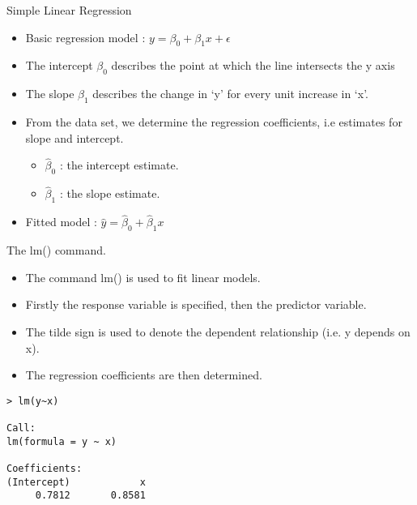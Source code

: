 \documentclass[pdf,default,slideColor,colorBG]{prosper}
\begin{document}
\begin{slide}{Simple Linear Regression}



\begin{itemize}
\item Basic regression model :
$y=\beta_{0} + \beta_{1}x + \epsilon$

\item
The intercept $\beta_{0}$ describes the point at which the line intersects
the y axis
\item The slope $\beta_{1}$ describes the change in `y'  for every unit increase in `x'.

\item From the data set, we determine the regression coefficients, i.e estimates for slope and intercept.

\begin{itemize}
\item
 $\hat{\beta}_{0}$ : the intercept estimate.
\item $\hat{\beta}_{1}$ : the slope estimate.
\end{itemize}
\item Fitted model : $\hat{y}=\hat{\beta}_{0} + \hat{\beta}_{1}x $
\end{itemize}


\end{slide}


\begin{slide}{The lm() command.}
\begin{itemize}
\item The command lm() is used to fit linear models. \item Firstly the response variable is specified, then the predictor variable. \item The tilde sign is used to denote the dependent relationship (i.e. y depends on x).
\item The regression coefficients are then determined.
\end{itemize}
\begin{verbatim}
> lm(y~x)

Call:
lm(formula = y ~ x)

Coefficients:
(Intercept)            x
     0.7812       0.8581
\end{verbatim}

\end{slide}
\end{document}
